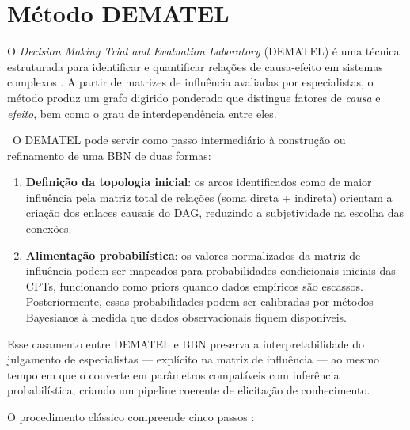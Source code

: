 \section{Método DEMATEL}
\label{sec:dematel}

O \emph{Decision Making Trial and Evaluation Laboratory} (DEMATEL) é uma técnica estruturada para identificar e quantificar relações de causa‑efeito em sistemas complexos \cite{tgJulio}. A partir de matrizes de influência avaliadas por especialistas, o método produz um grafo digirido ponderado que distingue fatores de \emph{causa} e \emph{efeito}, bem como o grau de interdependência entre eles.


\ O DEMATEL pode servir como passo intermediário à construção ou refinamento de uma BBN de duas formas:

\begin{enumerate}
  \item \textbf{Definição da topologia inicial}: os arcos identificados como de maior influência pela matriz total de relações (soma direta + indireta) orientam a criação dos enlaces causais do DAG, reduzindo a subjetividade na escolha das conexões.

  \item \textbf{Alimentação probabilística}: os valores normalizados da matriz de influência podem ser mapeados para probabilidades condicionais iniciais das CPTs, funcionando como priors quando dados empíricos são escassos. Posteriormente, essas probabilidades podem ser calibradas por métodos Bayesianos à medida que dados observacionais fiquem disponíveis.
\end{enumerate}

Esse casamento entre DEMATEL e BBN preserva a interpretabilidade do julgamento de especialistas — explícito na matriz de influência — ao mesmo tempo em que o converte em parâmetros compatíveis com inferência probabilística, criando um pipeline coerente de elicitação de conhecimento.

O procedimento clássico compreende cinco passos \cite{tgJulio,kaya2017}:

